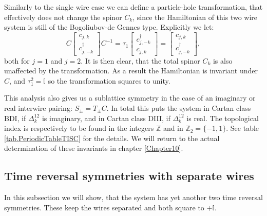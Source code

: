 Similarly to the single wire case we can define a particle-hole transformation, that effectively does not change the spinor $C_k$, since the Hamiltonian of this two wire system is still of the Bogoliubov-de Gennes type. Explicitly we let:
\begin{equation}
C\begin{bmatrix} c_{j,k} \\ c^\dagger_{j,-k} \end{bmatrix}C^{-1} = \tau_1 \begin{bmatrix} c^\dagger_{j,-k} \\ c_{j,k} \end{bmatrix} = \begin{bmatrix} c_{j,k} \\ c^\dagger_{j,-k} \end{bmatrix}, 
\end{equation} 
both for $j=1$ and $j=2$. It is then clear, that the total spinor $C_k$ is also unaffected by the transformation. As a result the Hamiltonian is invariant under $C$, and $\tau_1^2 = \mathbb{I}$ so the transformation squares to unity. 

This analysis also gives us a sublattice symmetry in the case of an imaginary or real interwire pairing: $S_\pm = T_\pm C$. In total this puts the system in Cartan class BDI, if $\Delta^{12}_k$ is imaginary, and in Cartan class DIII, if $\Delta^{12}_k$ is real. The topological index is respectively to be found in the integers $\mathbb{Z}$ and in $\mathbb{Z}_2 = \{-1,1\}$. See table \ref{tab.PeriodicTableTISC} for the details. We will return to the actual determination of these invariants in chapter \ref{Chapter10}. 

\subsection{Time reversal symmetries with separate wires}
In this subsection we will show, that the system has yet another two time reversal symmetries. These keep the wires separated and both square to $+\mathbb{I}$. 

